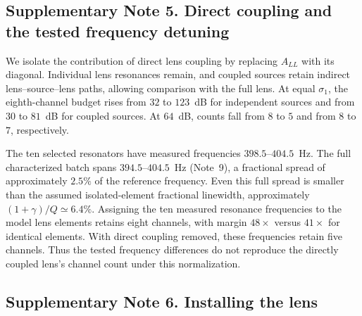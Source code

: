 \documentclass[pdflatex,sn-nature]{sn-jnl}%
\begin{document}
\subsection*{Supplementary Note 5. Direct coupling and the tested frequency detuning}

We isolate the contribution of direct lens coupling by replacing $A_{LL}$ with its diagonal. Individual lens resonances remain, and coupled sources retain indirect lens--source--lens paths, allowing comparison with the full lens. At equal $\sigma_1$, the eighth-channel budget
rises from $32$ to $123$~dB for independent sources and from $30$ to
$81$~dB for coupled sources. At $64$~dB, counts fall from $8$ to $5$ and
from $8$ to $7$, respectively.

The ten selected resonators have measured frequencies $398.5$--$404.5$~Hz. The full characterized batch spans $394.5$--$404.5$~Hz (Note~9), a fractional spread of approximately $2.5\%$ of the reference frequency. Even this full spread is smaller than the assumed isolated-element fractional linewidth, approximately $(1+\gamma)/Q\simeq6.4\%$.
Assigning the ten measured resonance frequencies to the model lens elements retains eight channels, with margin $48\times$ versus
$41\times$ for identical elements. With direct coupling removed, these
frequencies retain five channels. Thus the tested frequency differences do not reproduce the directly coupled lens's channel count under this normalization.

\subsection*{Supplementary Note 6. Installing the lens}
\end{document}
